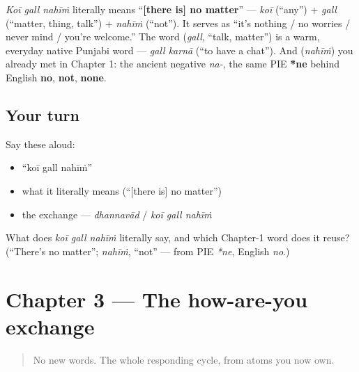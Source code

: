 \begin{cousinweb}
\emph{Koī gall nahīṁ} literally means \textquotedblleft{}\textbf{{[}there is{]} no matter}\textquotedblright{} — \emph{koī} (\textquotedblleft{}any\textquotedblright{}) + \emph{gall} (\textquotedblleft{}matter, thing, talk\textquotedblright{}) + \emph{nahīṁ} (\textquotedblleft{}not\textquotedblright{}). It serves as \textquotedblleft{}it's nothing / no worries / never mind / you're welcome.\textquotedblright{} The word \textbf{} (\emph{gall}, \textquotedblleft{}talk, matter\textquotedblright{}) is a warm, everyday native Punjabi word — \emph{gall karnā} (\textquotedblleft{}to have a chat\textquotedblright{}). And \textbf{} (\emph{nahīṁ}) you already met in Chapter 1: the ancient negative \emph{na-}, the same PIE \textbf{*ne} behind English \textbf{no}, \textbf{not}, \textbf{none}.
\end{cousinweb}

\subsection*{Your turn}
Say these aloud:

\begin{itemize}
\raggedright
  \item \textquotedblleft{}koī gall nahīṁ\textquotedblright{}
  \item what it literally means (\textquotedblleft{}{[}there is{]} no matter\textquotedblright{})
  \item the exchange — \emph{dhannavād} / \emph{koī gall nahīṁ}
\end{itemize}

\begin{tcolorbox}[breakable,colback=teal!4,colframe=teal!35!black,title={Before you move on}]
What does \emph{koī gall nahīṁ} literally say, and which Chapter-1 word does it reuse? (\textquotedblleft{}There's no matter\textquotedblright{}; \emph{nahīṁ}, \textquotedblleft{}not\textquotedblright{} — from PIE \emph{*ne}, English \emph{no}.)
\end{tcolorbox}
\section[Practice]{Chapter 3 — The how-are-you exchange}

\label{lesson:PA-C03-practice}



\begin{quote}
No new words. The whole responding cycle, from atoms you now own.
\end{quote}

